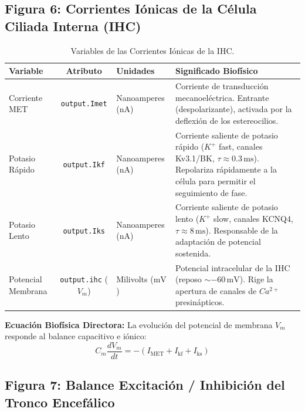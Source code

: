 \documentclass[12pt,a4paper]{article}
\begin{document}
\subsection{Figura 6: Corrientes Iónicas de la Célula Ciliada Interna (IHC)}

\begin{table}[H]
\centering
\caption{Variables de las Corrientes Iónicas de la IHC.}
\begin{tabular}{l c l p{6cm}}
\toprule
\textbf{Variable} & \textbf{Atributo} & \textbf{Unidades} & \textbf{Significado Biofísico} \\
\midrule
Corriente MET & \texttt{output.Imet} & Nanoamperes ($\text{nA}$) & Corriente de transducción mecanoeléctrica. Entrante (despolarizante), activada por la deflexión de los estereocilios. \\
Potasio Rápido & \texttt{output.Ikf} & Nanoamperes ($\text{nA}$) & Corriente saliente de potasio rápido ($K^+$ fast, canales Kv3.1/BK, $\tau \approx 0.3\,\text{ms}$). Repolariza rápidamente a la célula para permitir el seguimiento de fase. \\
Potasio Lento & \texttt{output.Iks} & Nanoamperes ($\text{nA}$) & Corriente saliente de potasio lento ($K^+$ slow, canales KCNQ4, $\tau \approx 8\,\text{ms}$). Responsable de la adaptación de potencial sostenida. \\
Potencial Membrana & \texttt{output.ihc} ($V_m$) & Milivolts ($\text{mV}$) & Potencial intracelular de la IHC (reposo $\sim -60\,\text{mV}$). Rige la apertura de canales de $Ca^{2+}$ presinápticos. \\
\bottomrule
\end{tabular}
\end{table}

\textbf{Ecuación Biofísica Directora:} La evolución del potencial de membrana $V_m$ responde al balance capacitivo e iónico:
\begin{equation}
C_m \frac{dV_m}{dt} = - \left( I_{\text{MET}} + I_{\text{kf}} + I_{\text{ks}} \right)
\end{equation}

\subsection{Figura 7: Balance Excitación / Inhibición del Tronco Encefálico}
\end{document}
